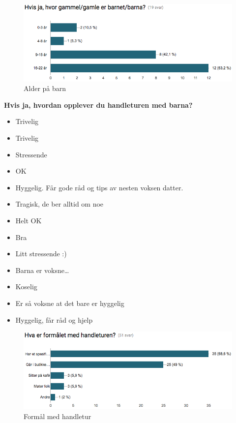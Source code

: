 \begin{figure}[H]
\includegraphics[scale=0.6]{images/sporreundersokelse/alderbarn}
\centering %
\caption{Alder på barn}
\label{fig:alderbarn}
\end{figure}

\noindent \large{\textbf{Hvis ja, hvordan opplever du handleturen med barna?}}
\begin{itemize}
    \item Trivelig
    \item Trivelig
    \item Stressende
    \item OK
    \item Hyggelig. Får gode råd og tips av nesten voksen datter.
    \item Tragisk, de ber alltid om noe
    \item Helt OK
    \item Bra
    \item Litt stressende :)
    \item Barna er voksne…
    \item Koselig
    \item Er så voksne at det bare er hyggelig
    \item Hyggelig, får råd og hjelp
\end{itemize}

\begin{figure}[H]
\includegraphics[scale=0.6]{images/sporreundersokelse/formal}
\centering %
\caption{Formål med handletur}
\label{fig:formal}
\end{figure}

